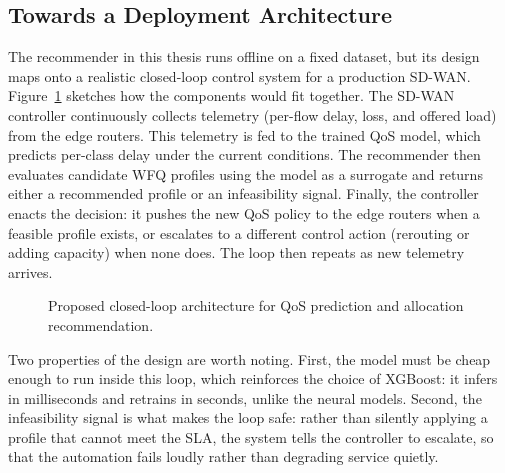 \documentclass[a4paper,12pt]{Classes/RoboticsLaTeX}
\begin{document}
\subsection{Towards a Deployment Architecture}
\label{sec:deployment}

The recommender in this thesis runs offline on a fixed dataset, but its design maps onto a realistic closed-loop control system for a production SD-WAN. Figure~\ref{fig:deployment} sketches how the components would fit together. The SD-WAN controller continuously collects telemetry (per-flow delay, loss, and offered load) from the edge routers. This telemetry is fed to the trained QoS model, which predicts per-class delay under the current conditions. The recommender then evaluates candidate WFQ profiles using the model as a surrogate and returns either a recommended profile or an infeasibility signal. Finally, the controller enacts the decision: it pushes the new QoS policy to the edge routers when a feasible profile exists, or escalates to a different control action (rerouting or adding capacity) when none does. The loop then repeats as new telemetry arrives.

\begin{figure}[H]
\centering
{}
\caption[Closed-loop deployment architecture]{Proposed closed-loop architecture for QoS prediction and allocation recommendation.}
\label{fig:deployment}
\end{figure}

Two properties of the design are worth noting. First, the model must be cheap enough to run inside this loop, which reinforces the choice of XGBoost: it infers in milliseconds and retrains in seconds, unlike the neural models. Second, the infeasibility signal is what makes the loop safe: rather than silently applying a profile that cannot meet the SLA, the system tells the controller to escalate, so that the automation fails loudly rather than degrading service quietly.
\end{document}
